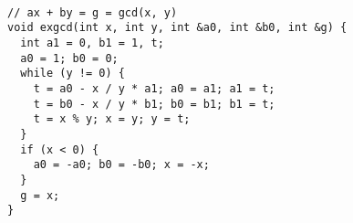 \begin{lstlisting}

// ax + by = g = gcd(x, y)
void exgcd(int x, int y, int &a0, int &b0, int &g) {
  int a1 = 0, b1 = 1, t;
  a0 = 1; b0 = 0;
  while (y != 0) {
    t = a0 - x / y * a1; a0 = a1; a1 = t;
    t = b0 - x / y * b1; b0 = b1; b1 = t;
    t = x % y; x = y; y = t;
  }
  if (x < 0) {
    a0 = -a0; b0 = -b0; x = -x;
  }
  g = x;
}

\end{lstlisting}